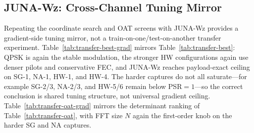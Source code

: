 \documentclass[journal]{IEEEtran}
\newcommand{\junawz}{JUNA-Wz}
\begin{document}
\begin{table}[t]
\centering
\caption{Mean payload-exact PSR swing from coarse one-factor-at-a-time
sensitivity screens. Bold entries are the largest local swing per channel; the
``outer pilot'' row varies the frequency-domain pilot fraction (generated from
\texttt{tex/figure\_data/tab\_oat.tex}).}
\label{tab:transfer-oat}
\small
\resizebox{\textwidth}{!}{}
\end{table}

\subsection{\texorpdfstring{\junawz{}}{JUNA-Wz}: Cross-Channel Tuning Mirror}
Repeating the coordinate search and OAT screens with \junawz{} provides a
gradient-side tuning mirror, not a train-on-one/test-on-another transfer
experiment. Table~\ref{tab:transfer-best-grad} mirrors
Table~\ref{tab:transfer-best}: QPSK is again the stable modulation, the stronger
HW configurations again use denser pilots and conservative FEC, and \junawz{}
reaches payload-exact ceiling on SG-1, NA-1, HW-1, and HW-4. The harder captures
do not all saturate---for example SG-2/3, NA-2/3, and HW-5/6 remain below
PSR${=}1$---so the correct conclusion is shared tuning structure, not universal
gradient ceiling. Table~\ref{tab:transfer-oat-grad} mirrors the determinant
ranking of Table~\ref{tab:transfer-oat}, with FFT size $N$ again the
first-order knob on the harder SG and NA captures.

\begin{table}[t]
\centering
\caption{\junawz{} mirror of Table~\ref{tab:transfer-best}: best
coordinate-search configuration per replay capture at 20\,dB for the
\texttt{wz\_juna} receiver. PSR is payload-exact replay acceptance and
\emph{acc./pkts.} gives the accepted/scheduled packet denominator (generated
from \texttt{tex/figure\_data/tab\_best\_grad.tex}).}
\label{tab:transfer-best-grad}
\small
\resizebox{\textwidth}{!}{}
\end{table}

\begin{table}[t]
\centering
\caption{\junawz{} mirror of Table~\ref{tab:transfer-oat}: mean
payload-exact PSR swing from one-factor-at-a-time screens for the
\texttt{wz\_juna} receiver. Bold entries are the largest local swing per channel
(generated from \texttt{tex/figure\_data/tab\_oat\_grad.tex}).}
\label{tab:transfer-oat-grad}
\small
\resizebox{\textwidth}{!}{}
\end{table}
\end{document}
